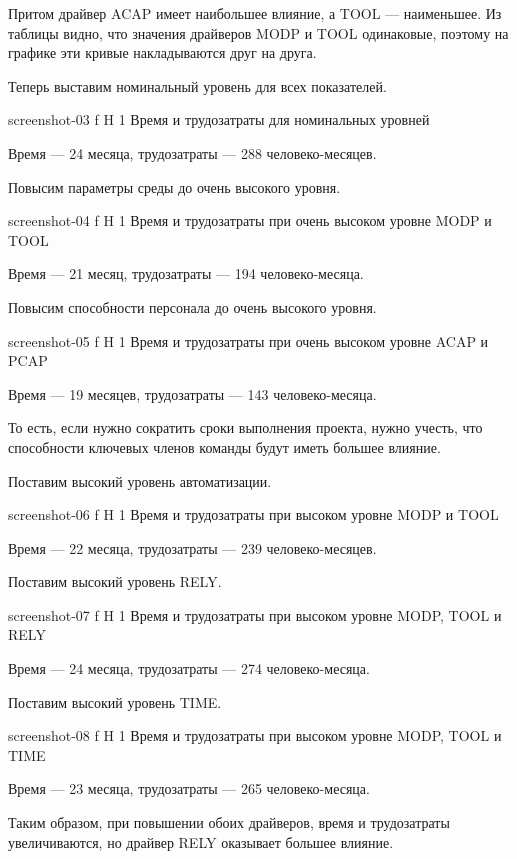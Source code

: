 \documentclass{bmstu}
\begin{document}
Притом драйвер ACAP имеет наибольшее влияние, а TOOL --- наименьшее. 
Из таблицы видно, что значения драйверов MODP и TOOL одинаковые, поэтому на графике эти кривые накладываются друг на друга.

Теперь выставим номинальный уровень для всех показателей. 

    {screenshot-03}
    {f}
    {H}
    {1\textwidth}
    {Время и трудозатраты для номинальных уровней}
    
Время --- 24 месяца, трудозатраты --- 288 человеко-месяцев.

Повысим параметры среды до очень высокого уровня. 

    {screenshot-04}
    {f}
    {H}
    {1\textwidth}
    {Время и трудозатраты при очень высоком уровне MODP и TOOL}
    
Время --- 21 месяц, трудозатраты --- 194 человеко-месяца.

Повысим способности персонала до очень высокого уровня. 

    {screenshot-05}
    {f}
    {H}
    {1\textwidth}
    {Время и трудозатраты при очень высоком уровне ACAP и PCAP}
    
Время --- 19 месяцев, трудозатраты --- 143 человеко-месяца.

То есть, если нужно сократить сроки выполнения проекта, нужно учесть, что способности ключевых членов команды будут иметь большее влияние.

Поставим высокий уровень автоматизации. 

    {screenshot-06}
    {f}
    {H}
    {1\textwidth}
    {Время и трудозатраты при высоком уровне MODP и TOOL}
    
Время --- 22 месяца, трудозатраты --- 239 человеко-месяцев.

Поставим высокий уровень RELY.

    {screenshot-07}
    {f}
    {H}
    {1\textwidth}
    {Время и трудозатраты при высоком уровне MODP, TOOL и RELY}
    
Время --- 24 месяца, трудозатраты --- 274 человеко-месяца.

Поставим высокий уровень TIME.

    {screenshot-08}
    {f}
    {H}
    {1\textwidth}
    {Время и трудозатраты при высоком уровне MODP, TOOL и TIME}
    
Время --- 23 месяца, трудозатраты --- 265 человеко-месяца.

Таким образом, при повышении обоих драйверов, время и трудозатраты увеличиваются, но драйвер RELY оказывает большее влияние. 
\end{document}
